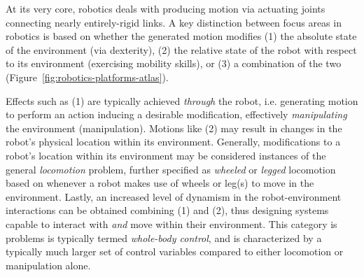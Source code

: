 At its very core, robotics deals with producing motion via actuating joints connecting nearly entirely-rigid links.
A key distinction between focus areas in robotics is based on whether the generated motion modifies (1) the absolute state of the environment (via dexterity), (2) the relative state of the robot with respect to its environment (exercising mobility skills), or (3) a combination of the two (Figure~\ref{fig:robotics-platforms-atlas}).

Effects such as (1) are typically achieved \emph{through} the robot, i.e. generating motion to perform an action inducing a desirable modification, effectively \emph{manipulating} the environment (manipulation).
Motions like (2) may result in changes in the robot's physical location within its environment.
Generally, modifications to a robot's location within its environment may be considered instances of the general \emph{locomotion} problem, further specified as \emph{wheeled} or \emph{legged} locomotion based on whenever a robot makes use of wheels or leg(s) to move in the environment.
Lastly, an increased level of dynamism in the robot-environment interactions can be obtained combining (1) and (2), thus designing systems capable to interact with \emph{and} move within their environment.
This category is problems is typically termed \emph{whole-body control}, and is characterized by a typically much larger set of control variables compared to either locomotion or manipulation alone.

